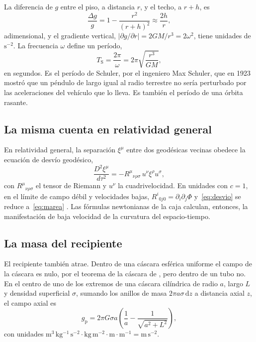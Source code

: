 \documentclass[11pt,a4paper]{article}
\begin{document}
La diferencia de $g$ entre el piso, a distancia $r$, y el techo, a $r + h$, es
\begin{equation}\label{eq:dg}
\frac{\Delta g}{g} = 1 - \frac{r^2}{(r+h)^2} \approx \frac{2h}{r},
\end{equation}
adimensional, y el gradiente vertical, $|\partial g/\partial r| = 2GM/r^3 = 2\omega^2$, tiene unidades de $\mathrm{s^{-2}}$. La frecuencia $\omega$ define un período,
\begin{equation}\label{eq:schuler}
T_{\mathrm{S}} = \frac{2\pi}{\omega} = 2\pi\sqrt{\frac{r^3}{GM}},
\end{equation}
en segundos. Es el período de Schuler, por el ingeniero Max Schuler, que en 1923 mostró que un péndulo de largo igual al radio terrestre no sería perturbado por las aceleraciones del vehículo que lo lleva. Es también el período de una órbita rasante.

\subsection{La misma cuenta en relatividad general}

En relatividad general, la separación $\xi^\mu$ entre dos geodésicas vecinas obedece la ecuación de desvío geodésico,
\begin{equation}\label{eq:desvio}
\frac{D^2 \xi^\mu}{d\tau^2} = -R^\mu{}_{\nu\rho\sigma}\, u^\nu \xi^\rho u^\sigma ,
\end{equation}
con $R^\mu{}_{\nu\rho\sigma}$ el tensor de Riemann y $u^\nu$ la cuadrivelocidad. En unidades con $c = 1$, en el límite de campo débil y velocidades bajas, $R^i{}_{0j0} = \partial_i\partial_j\Phi$ y~\eqref{eq:desvio} se reduce a~\eqref{eq:marea} \parencite{schutz2009}. Las fórmulas newtonianas de la caja calculan, entonces, la manifestación de baja velocidad de la curvatura del espacio-tiempo.

\subsection{La masa del recipiente}

El recipiente también atrae. Dentro de una cáscara esférica uniforme el campo de la cáscara es nulo, por el teorema de la cáscara de \textcite{newton1687}, pero dentro de un tubo no. En el centro de uno de los extremos de una cáscara cilíndrica de radio $a$, largo $L$ y densidad superficial $\sigma$, sumando los anillos de masa $2\pi a\sigma\,\mathrm{d}z$ a distancia axial $z$, el campo axial es
\begin{equation}\label{eq:cascara}
g_{\mathrm{p}} = 2\pi G \sigma a \left(\frac{1}{a} - \frac{1}{\sqrt{a^2 + L^2}}\right),
\end{equation}
con unidades $\mathrm{m^3\,kg^{-1}\,s^{-2}\cdot kg\,m^{-2}\cdot m\cdot m^{-1}} = \mathrm{m\,s^{-2}}$.
\end{document}
